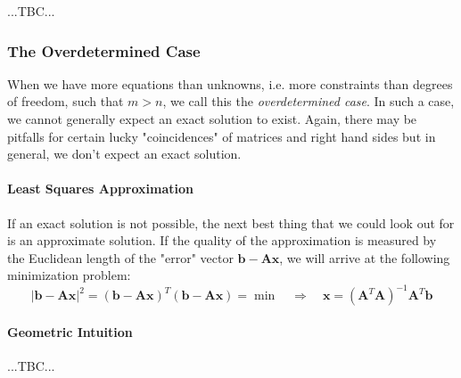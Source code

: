  ...TBC...





\subsubsection{The Overdetermined Case}
When we have more equations than unknowns, i.e. more constraints than degrees of freedom, such that $m > n$, we call this the \emph{overdetermined case}. In such a case, we cannot generally expect an exact solution to exist. Again, there may be pitfalls for certain lucky "coincidences" of matrices and right hand sides but in general, we don't expect an exact solution.



\paragraph{Least Squares Approximation}
If an exact solution is not possible, the next best thing that we could look out for is an approximate solution. If the quality of the approximation is measured by the Euclidean length of the "error" vector $\mathbf{b} - \mathbf{A x}$, we will arrive at the following minimization problem:
\begin{equation}
|\mathbf{b} - \mathbf{A x}|^2 = (\mathbf{b} - \mathbf{A x})^T (\mathbf{b} - \mathbf{A x}) = \min
\quad \Rightarrow \quad
\boxed{ \mathbf{x} = (\mathbf{A}^T \mathbf{A})^{-1} \mathbf{A}^T \mathbf{b} }
\end{equation}

\paragraph{Geometric Intuition} ...TBC...


